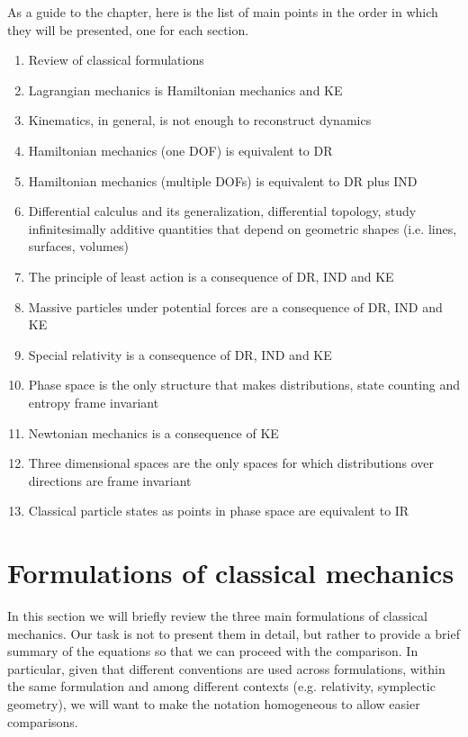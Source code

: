 As a guide to the chapter, here is the list of main points in the order in which they will be presented, one for each section.
\begin{enumerate}
	\item Review of classical formulations
	\item Lagrangian mechanics is Hamiltonian mechanics and KE
	\item Kinematics, in general, is not enough to reconstruct dynamics
	\item Hamiltonian mechanics (one DOF) is equivalent to DR
	\item Hamiltonian mechanics (multiple DOFs) is equivalent to DR plus IND
	\item Differential calculus and its generalization, differential topology, study infinitesimally additive quantities that depend on geometric shapes (i.e. lines, surfaces, volumes)
	\item The principle of least action is a consequence of DR, IND and KE
	\item Massive particles under potential forces are a consequence of DR, IND and KE
	\item Special relativity is a consequence of DR, IND and KE
	\item Phase space is the only structure that makes distributions, state counting and entropy frame invariant
	\item Newtonian mechanics is a consequence of KE
	\item Three dimensional spaces are the only spaces for which distributions over directions are frame invariant
	\item Classical particle states as points in phase space are equivalent to IR
\end{enumerate}

\section{Formulations of classical mechanics}

In this section we will briefly review the three main formulations of classical mechanics. Our task is not to present them in detail, but rather to provide a brief summary of the equations so that we can proceed with the comparison. In particular, given that different conventions are used across formulations, within the same formulation and among different contexts (e.g. relativity, symplectic geometry), we will want to make the notation homogeneous to allow easier comparisons.


